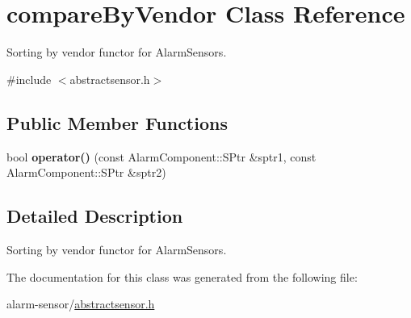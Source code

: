 \hypertarget{classcompareByVendor}{}\section{compare\+By\+Vendor Class Reference}
\label{classcompareByVendor}


Sorting by vendor functor for Alarm\+Sensors.  




{\ttfamily \#include $<$abstractsensor.\+h$>$}

\subsection*{Public Member Functions}
\begin{DoxyCompactItemize}
\item 
bool {\bfseries operator()} (const Alarm\+Component\+::\+S\+Ptr \&sptr1, const Alarm\+Component\+::\+S\+Ptr \&sptr2)\hypertarget{classcompareByVendor_a10b4288c8c40f52bf6360d3c137ad883}{}\label{classcompareByVendor_a10b4288c8c40f52bf6360d3c137ad883}

\end{DoxyCompactItemize}


\subsection{Detailed Description}
Sorting by vendor functor for Alarm\+Sensors. 

The documentation for this class was generated from the following file\+:\begin{DoxyCompactItemize}
\item 
alarm-\/sensor/\hyperlink{abstractsensor_8h}{abstractsensor.\+h}\end{DoxyCompactItemize}

